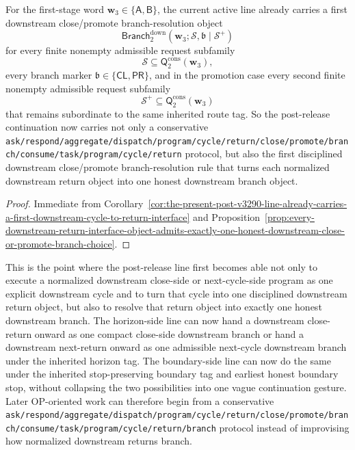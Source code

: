 \begin{corollary}
\label{cor:the-present-post-v3290-line-already-carries-a-first-downstream-close-promote-branch-resolution-rule}
For the first-stage word \(\mathbf w_3\in\{\mathsf A,\mathsf B\}\), the current active line already carries a first downstream close/promote branch-resolution object
\[
 \mathsf{Branch}^{\mathrm{down}}_{2}(\mathbf w_3;\mathcal S,\mathfrak b\mid\mathcal S^{+})
\]
for every finite nonempty admissible request subfamily
\[
 \mathcal S\subseteq \mathsf{Q}^{\mathrm{cons}}_{2}(\mathbf w_3),
\]
every branch marker \(\mathfrak b\in\{\mathsf{CL},\mathsf{PR}\}\), and in the promotion case every second finite nonempty admissible request subfamily
\[
 \mathcal S^{+}\subseteq \mathsf{Q}^{\mathrm{cons}}_{2}(\mathbf w_3)
\]
that remains subordinate to the same inherited route tag. So the post-release continuation now carries not only a conservative {\nolinkurl{ask/respond/aggregate/dispatch/program/cycle/return/close/promote/branch/consume/task/program/cycle/return}} protocol, but also the first disciplined downstream close/promote branch-resolution rule that turns each normalized downstream return object into one honest downstream branch object.
\end{corollary}

\begin{proof}
Immediate from Corollary~\ref{cor:the-present-post-v3290-line-already-carries-a-first-downstream-cycle-to-return-interface} and Proposition~\ref{prop:every-downstream-return-interface-object-admits-exactly-one-honest-downstream-close-or-promote-branch-choice}.
\end{proof}

\begin{remark}
\label{rem:what-the-first-downstream-close-promote-branch-resolution-rule-now-buys}
This is the point where the post-release line first becomes able not only to execute a normalized downstream close-side or next-cycle-side program as one explicit downstream cycle and to turn that cycle into one disciplined downstream return object, but also to resolve that return object into exactly one honest downstream branch. The horizon-side line can now hand a downstream close-return onward as one compact close-side downstream branch or hand a downstream next-return onward as one admissible next-cycle downstream branch under the inherited horizon tag. The boundary-side line can now do the same under the inherited stop-preserving boundary tag and earliest honest boundary stop, without collapsing the two possibilities into one vague continuation gesture. Later OP-oriented work can therefore begin from a conservative {\nolinkurl{ask/respond/aggregate/dispatch/program/cycle/return/close/promote/branch/consume/task/program/cycle/return/branch}} protocol instead of improvising how normalized downstream returns branch.
\end{remark}



